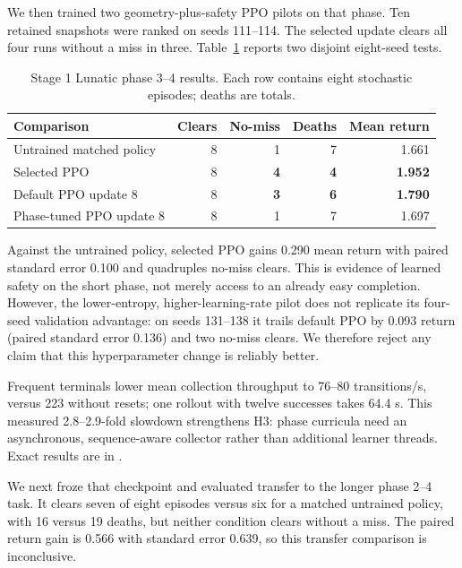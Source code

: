 \documentclass[10pt]{article}
\begin{document}
We then trained two geometry-plus-safety PPO pilots on that phase.  Ten retained
snapshots were ranked on seeds 111--114.  The selected update clears all four
runs without a miss in three.  Table~\ref{tab:curriculum} reports two disjoint
eight-seed tests.

\begin{table}[ht]
  \centering
  \caption{Stage 1 Lunatic phase 3--4 results.  Each row contains eight
  stochastic episodes; deaths are totals.}
  \label{tab:curriculum}
  \begin{tabular}{lrrrr}
    \toprule
    Comparison & Clears & No-miss & Deaths & Mean return \\
    \midrule
    Untrained matched policy & 8 & 1 & 7 & 1.661 \\
    Selected PPO & 8 & \textbf{4} & \textbf{4} & \textbf{1.952} \\
    \midrule
    Default PPO update 8 & 8 & \textbf{3} & \textbf{6} & \textbf{1.790} \\
    Phase-tuned PPO update 8 & 8 & 1 & 7 & 1.697 \\
    \bottomrule
  \end{tabular}
\end{table}

Against the untrained policy, selected PPO gains 0.290 mean return with paired
standard error 0.100 and quadruples no-miss clears.  This is evidence of learned
safety on the short phase, not merely access to an already easy completion.
However, the lower-entropy, higher-learning-rate pilot does not replicate its
four-seed validation advantage: on seeds 131--138 it trails default PPO by
0.093 return (paired standard error 0.136) and two no-miss clears.  We therefore
reject any claim that this hyperparameter change is reliably better.

Frequent terminals lower mean collection throughput to 76--80 transitions/s,
versus 223 without resets; one rollout with twelve successes takes 64.4 s.
This measured 2.8--2.9-fold slowdown strengthens H3: phase curricula need an
asynchronous, sequence-aware collector rather than additional learner threads.
Exact results are in
.

We next froze that checkpoint and evaluated transfer to the longer phase 2--4
task.  It clears seven of eight episodes versus six for a matched untrained
policy, with 16 versus 19 deaths, but neither condition clears without a miss.
The paired return gain is 0.566 with standard error 0.639, so this transfer
comparison is inconclusive.
\end{document}

